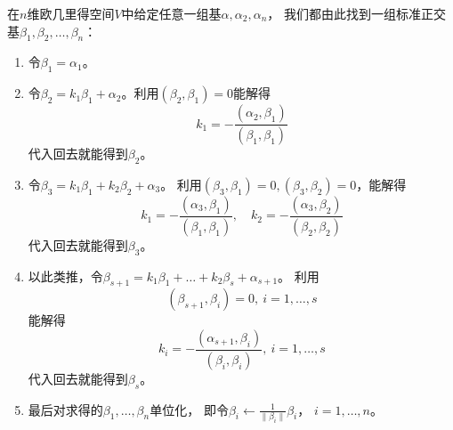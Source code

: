 \begin{theorem}
  在$n$维欧几里得空间$V$中给定任意一组基$\alpha,\alpha_2,\alpha_n$，
  我们都由此找到一组标准正交基$\beta_1,\beta_2,\dots,\beta_n$：
  \begin{enumerate}
    \item 
    令$\beta_1=\alpha_1$。
    \item
    令$\beta_2=k_1\beta_1+\alpha_2$。利用$(\beta_2,\beta_1)=0$能解得
    \begin{displaymath}
      k_1 = -\frac{(\alpha_2,\beta_1)}{(\beta_1,\beta_1)}
    \end{displaymath}
    代入回去就能得到$\beta_2$。
    \item
    令$\beta_3=k_1\beta_1+k_2\beta_2+\alpha_3$。
    利用$(\beta_3,\beta_1)=0,(\beta_3,\beta_2)=0$，能解得
    \begin{displaymath}
      k_1 = -\frac{(\alpha_3,\beta_1)}{(\beta_1,\beta_1)},\quad
      k_2 = -\frac{(\alpha_3,\beta_2)}{(\beta_2,\beta_2)}
    \end{displaymath}
    代入回去就能得到$\beta_3$。
    \item
    以此类推，令$\beta_{s+1}=k_1\beta_1+\dots+k_2\beta_s+\alpha_{s+1}$。
    利用\[ (\beta_{s+1},\beta_{i})=0,\ i=1,\dots,s \]
    能解得
    \begin{displaymath}
      k_i = -\frac{(\alpha_{s+1},\beta_{i})}{(\beta_{i},\beta_{i})},
      \ i=1,\dots,s
    \end{displaymath}
    代入回去就能得到$\beta_s$。
    \item
    最后对求得的$\beta_1,\dots,\beta_n$单位化，
    即令$\beta_i\leftarrow\frac{1}{\|\beta_i\|}\beta_i$，
    $i=1,\dots,n$。
  \end{enumerate}
\end{theorem}


